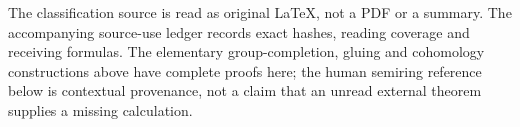 The classification source is read as original LaTeX, not a PDF or
a summary. The accompanying source-use ledger records exact hashes,
reading coverage and receiving formulas. The elementary group-completion,
gluing and cohomology constructions above have complete proofs here;
the human semiring reference below is contextual provenance, not a
claim that an unread external theorem supplies a missing calculation.

